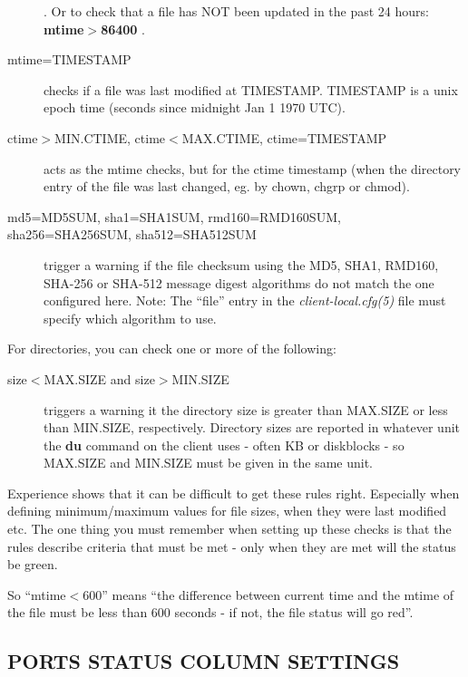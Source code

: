 \begin{description}
. Or to check that a file has NOT been updated in the past 24 hours: \textbf{mtime$>$86400}
. 
\item[mtime=TIMESTAMP] checks if a file was last modified at TIMESTAMP. TIMESTAMP is a unix epoch time (seconds since midnight Jan 1 1970 UTC). 
\item[ctime$>$MIN.CTIME, ctime$<$MAX.CTIME, ctime=TIMESTAMP] acts as the mtime checks, but for the ctime timestamp (when the directory entry of the file was last changed, eg. by chown, chgrp or chmod). 
\item[md5=MD5SUM, sha1=SHA1SUM, rmd160=RMD160SUM, sha256=SHA256SUM, sha512=SHA512SUM] trigger a warning if the file checksum using the MD5, SHA1, RMD160, SHA-256 or SHA-512 message digest algorithms do not match the one configured here. Note: The ``file'' entry in the \emph{client-local.cfg(5)}
 file must specify which algorithm to use. 

 


\end{description}



  For directories, you can check one or more of the following: \begin{description}
\item[size$<$MAX.SIZE and size$>$MIN.SIZE] triggers a warning it the directory size is greater than MAX.SIZE or less than MIN.SIZE, respectively. Directory sizes are reported in whatever unit the \textbf{du}
 command on the client uses - often KB or diskblocks - so MAX.SIZE and MIN.SIZE must be given in the same unit. 

 


\end{description}



  Experience shows that it can be difficult to get these rules right. Especially when defining minimum/maximum values for file sizes, when they were last modified etc. The one thing you must remember when setting up these checks is that the rules describe criteria that must be met - only when they are met will the status be green. 


  So ``mtime$<$600'' means ``the difference between current time and the mtime of the file must be less than 600 seconds - if not, the file status will go red''. 


 


 
\subsection{PORTS STATUS COLUMN SETTINGS}


